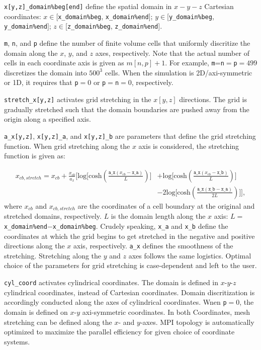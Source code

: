 \documentclass[11pt]{article}
\begin{document}
\texttt{x[y,z]\_domain\%beg[end]} define the spatial domain in $x-y-z$ Cartesian coordinates:
$x\in$[\texttt{x\_domain\%beg}, \texttt{x\_domain\%end}]; $y\in$[\texttt{y\_domain\%beg}, \texttt{y\_domain\%end}]; $z\in$[\texttt{z\_domain\%beg}, \texttt{z\_domain\%end}].

\texttt{m}, \texttt{n}, and \texttt{p} define the number of finite volume cells that uniformly discritize the domain along the $x$, $y$, and $z$ axes, respectively.
Note that the actual number of cells in each coordinate axis is given as $m[n,p]+1$.
For example, \texttt{m}=\texttt{n}$=$\texttt{p}$=499$ discretizes the domain into $500^3$ cells. 
When the simulation is 2D/axi-symmetric or 1D, it requires that \texttt{p}$=0$ or \texttt{p}$=$\texttt{n}$=0$, respectively.

\texttt{stretch\_x[y,z]} activates grid stretching in the $x[y,z]$ directions.
The grid is gradually stretched such that the domain boundaries are pushed away from the origin along a specified axis.

\texttt{a\_x[y,z]}, \texttt{x[y,z]\_a}, and \texttt{x[y,z]\_b} are parameters that define the grid stretching function. When grid stretching along the $x$ axis is considered, the stretching function is given as:

\begin{align}
    x_{cb,stretch}=x_{cb}+\frac{x_{cb}}{a_x}
   \bigg[
     \mathrm{log}\big[\mathrm{cosh}(\frac{\texttt{a\_x}(x_{cb}-\texttt{x\_a})}{L})\big]
    &+ \mathrm{log}\big[\mathrm{cosh}(\frac{\texttt{a\_x}(x_{cb}-\texttt{x\_b})}{L})\big] \nonumber\\ 
    &- 2\mathrm{log}\big[\mathrm{cosh}(\frac{\texttt{a\_x}(\texttt{x\_b}-\texttt{x\_a})}{2L})\big]
    \bigg],
\end{align}
where $x_{cb}$ and $x_{cb,stretch}$ are the coordinates of a cell boundary at the original and stretched domains, respectively. $L$ is the domain length along the $x$ axis: $L=$\texttt{x\_domain\%end}$-$\texttt{x\_domain\%beg}. Crudely speaking, \texttt{x\_a} and \texttt{x\_b} define the coordinates at which the grid begins to get stretched in the negative and positive directions along the $x$ axis, respectively. \texttt{a\_x} defines the smoothness of the stretching. Stretching along the $y$ and $z$ axes follows the same logistics. Optimal choice of the parameters for grid stretching is case-dependent and left to the user.

\texttt{cyl\_coord} activates cylindrical coordinates. The domain is defined in $x$-$y$-$z$ cylindrical coordinates, instead of Cartesian coordinates. Domain discritization is accordingly conducted along the axes of cylindrical coordinates. Wnen \texttt{p}$=0$, the domain is defined on $x$-$y$ axi-symmetric coordinates. In both Coordinates, mesh stretching can be defined along the $x$- and $y$-axes. MPI topology is automatically optimized to maximize the parallel efficiency for given choice of coordinate systems. \citet{Meng16}
\end{document}
